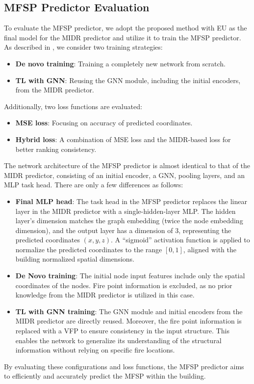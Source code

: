 \subsection{MFSP Predictor Evaluation}
\label{subsec:mfsp_eval}
To evaluate the MFSP predictor, we adopt the proposed method with EU as the final model for the MIDR predictor and utilize it to train the MFSP predictor. As described in , we consider two training strategies:
\begin{itemize}
    \item {\bf{De novo training}}: Training a completely new network from scratch.
    \item {\bf{TL with GNN}}: Reusing the GNN module, including the initial encoders, from the MIDR predictor. 
\end{itemize}
Additionally, two loss functions are evaluated: 
\begin{itemize}
    \item {\bf{MSE loss}}: Focusing on accuracy of predicted coordinates.
    \item {\bf{Hybrid loss}}: A combination of MSE loss and the MIDR-based loss for better ranking consistency.
\end{itemize}
The network architecture of the MFSP predictor is almost identical to that of the MIDR predictor, consisting of an initial encoder, a GNN, pooling layers, and an MLP task head. There are only a few differences as follows:
\begin{itemize}
    \item {\bf{Final MLP head}}: The task head in the MFSP predictor replaces the linear layer in the MIDR predictor with a single-hidden-layer MLP. The hidden layer's dimension matches the graph embedding (twice the node embedding dimension), and the output layer has a dimension of 3, representing the predicted coordinates $(x, y, z)$. A ``sigmoid'' activation function is applied to normalize the predicted coordinates to the range $[0,1]$, aligned with the building normalized spatial dimensions.
    \item {\bf{De Novo training}}: The initial node input features include only the spatial coordinates of the nodes. Fire point information is excluded, as no prior knowledge from the MIDR predictor is utilized in this case.
    \item {\bf{TL with GNN training}}: The GNN module and initial encoders from the MIDR predictor are directly reused. Moreover, the fire point information is replaced with a VFP to ensure consistency in the input structure. This enables the network to generalize its understanding of the structural information without relying on specific fire locations.
\end{itemize}
By evaluating these configurations and loss functions, the MFSP predictor aims to efficiently and accurately predict the MFSP within the building.

